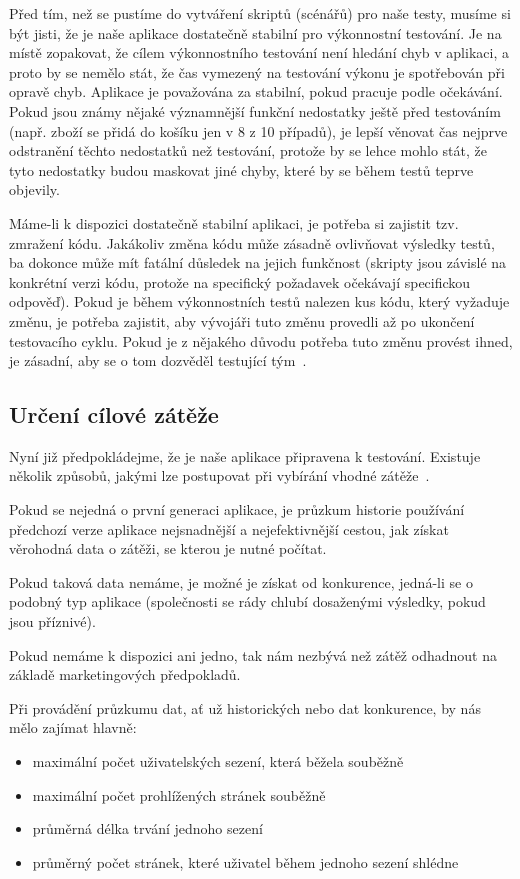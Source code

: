\documentclass[122pt,oneside]{fithesis}
\begin{document}
Před tím, než se pustíme do vytváření skriptů (scénářů) pro naše testy, musíme si být jisti, že je naše aplikace dostatečně stabilní pro výkonnostní testování. Je na místě zopakovat, že cílem výkonnostního testování není hledání chyb v aplikaci, a proto by se nemělo stát, že čas vymezený na testování výkonu je spotřebován při opravě chyb. Aplikace je považována za stabilní, pokud pracuje podle očekávání. Pokud jsou známy nějaké významnější funkční nedostatky ještě před testováním (např. zboží se přidá do košíku jen v 8 z 10 případů), je lepší věnovat čas nejprve odstranění těchto nedostatků než testování, protože by se lehce mohlo stát, že tyto nedostatky budou maskovat jiné chyby, které by se během testů teprve objevily.

Máme-li k dispozici dostatečně stabilní aplikaci, je potřeba si zajistit tzv. zmražení kódu. Jakákoliv změna kódu může zásadně ovlivňovat výsledky testů, ba dokonce může mít fatální důsledek na jejich funkčnost (skripty jsou závislé na konkrétní verzi kódu, protože na specifický požadavek očekávají specifickou odpověď). Pokud je během výkonnostních testů nalezen kus kódu, který vyžaduje změnu, je potřeba zajistit, aby vývojáři tuto změnu provedli až po ukončení testovacího cyklu. Pokud je z nějakého důvodu potřeba tuto změnu provést ihned, je zásadní, aby se o tom dozvěděl testující tým~\cite{molyneaux09}.

\subsection{Určení cílové zátěže}

Nyní již předpokládejme, že je naše aplikace připravena k testování. Existuje několik způsobů, jakými lze postupovat při vybírání vhodné zátěže~\cite{barber11}.

Pokud se nejedná o první generaci aplikace, je průzkum historie používání předchozí verze aplikace nejsnadnější a nejefektivnější cestou, jak získat věrohodná data o zátěži, se kterou je nutné počítat.

Pokud taková data nemáme, je možné je získat od konkurence, jedná-li se o podobný typ aplikace (společnosti se rády chlubí dosaženými výsledky, pokud jsou příznivé).

Pokud nemáme k dispozici ani jedno, tak nám nezbývá než zátěž odhadnout na základě marketingových předpokladů.

Při provádění průzkumu dat, ať už historických nebo dat konkurence, by nás mělo zajímat hlavně:
\begin{itemize}
  \item maximální počet uživatelských sezení, která běžela souběžně
  \item maximální počet prohlížených stránek souběžně
  \item průměrná délka trvání jednoho sezení
  \item průměrný počet stránek, které uživatel během jednoho sezení shlédne
\end{itemize}
\end{document}
